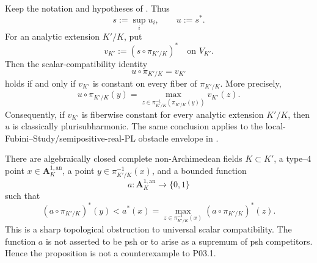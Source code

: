 \begin{corollary}
\label{cor:p031-fiber-constancy-upgrade}
Keep the notation and hypotheses of
.  Thus
\[
       s:=\sup_i u_i,
       \qquad
       u:=s^*.
\]
For an analytic extension $K'/K$, put
\[
       v_{K'}:=(s\circ\pi_{K'/K})^*
       \quad\text{on }V_{K'}.
\]
Then the scalar-compatibility identity
\begin{equation}
\label{eq:p031-fiber-constancy}
       u\circ\pi_{K'/K}=v_{K'}
\end{equation}
holds if and only if $v_{K'}$ is constant on every fiber of
$\pi_{K'/K}$.  More precisely,
\begin{equation}
\label{eq:p031-perron-fiber-maximum}
 u\circ\pi_{K'/K}(y)
   =\max_{z\in\pi_{K'/K}^{-1}(\pi_{K'/K}(y))}v_{K'}(z).
\end{equation}
Consequently, if $v_{K'}$ is fiberwise constant for every analytic
extension $K'/K$, then $u$ is classically plurisubharmonic.  The same
conclusion applies to the local-Fubini--Study/semipositive-real-PL obstacle
envelope in .
\end{corollary}

\begin{proposition}
\label{prop:p031-type-four-topological-defect}
There are algebraically closed complete non-Archimedean fields $K\subset
K'$, a type--$4$ point $x\in\mathbf A_K^{1,\mathrm{an}}$, a point
$y\in\pi_{K'/K}^{-1}(x)$, and a bounded function
\[
             a:\mathbf A_K^{1,\mathrm{an}}\longrightarrow\{0,1\}
\]
such that
\begin{equation}
\label{eq:p031-type-four-strict-defect}
 (a\circ\pi_{K'/K})^*(y)
       <a^*(x)
       =\max_{z\in\pi_{K'/K}^{-1}(x)}
                    (a\circ\pi_{K'/K})^*(z).
\end{equation}
This is a sharp topological obstruction to universal scalar compatibility.
The function $a$ is not asserted to be psh or to arise as a supremum of
psh competitors.  Hence the proposition is not a counterexample to P03.1.
\end{proposition}
